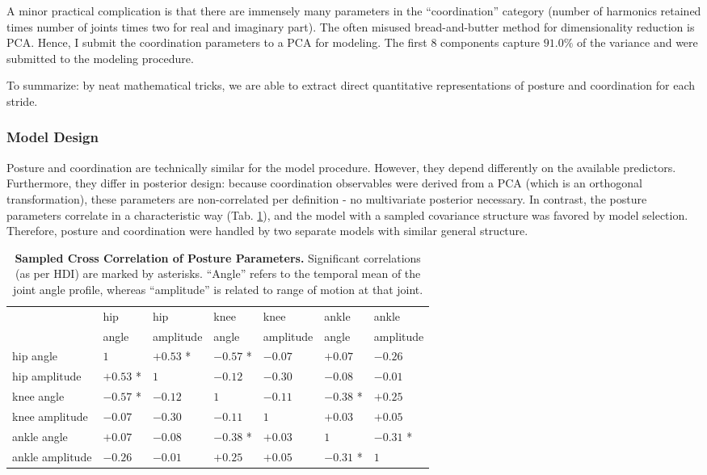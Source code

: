 A minor practical complication is that there are immensely many parameters in the ``coordination'' category (number of harmonics retained times number of joints times two for real and imaginary part).
The often misused bread-and-butter method for dimensionality reduction is PCA.
Hence, I submit the coordination parameters to a PCA for modeling.
The first \(8\) components capture \(91.0 \%\) of the variance and were submitted to the modeling procedure.


To summarize: by neat mathematical tricks, we are able to extract direct quantitative representations of posture and coordination for each stride.


\subsubsection{Model Design}
\label{sec:orga2e576d}
Posture and coordination are technically similar for the model procedure.
However, they depend differently on the available predictors.
Furthermore, they differ in posterior design: because coordination observables were derived from a PCA (which is an orthogonal transformation), these parameters are non-correlated per definition - no multivariate posterior necessary.
In contrast, the posture parameters correlate in a characteristic way (Tab. \ref{tab:posturecorrelation}), and the model with a sampled covariance structure was favored by model selection.
Therefore, posture and coordination were handled by two separate models with similar general structure.

\begin{table}[p]
\caption{\label{tab:posturecorrelation}\textbf{Sampled Cross Correlation of Posture Parameters.} Significant correlations (as per HDI) are marked by asterisks. ``Angle'' refers to the temporal mean of the joint angle profile, whereas ``amplitude'' is related to range of motion at that joint.}
\centering
\begin{tabular}{|l|l|l|l|l|l|l|}
\hline
 & hip & hip & knee & knee & ankle & ankle \\[0pt]
 & angle & amplitude & angle & amplitude & angle & amplitude\\[0pt]
\hline
hip angle & \(1\) & \(+0.53\) * & \(-0.57\) * & \(-0.07\) & \(+0.07\) & \(-0.26\)\\[0pt]
hip amplitude & \(+0.53\) * & \(1\) & \(-0.12\) & \(-0.30\) & \(-0.08\) & \(-0.01\)\\[0pt]
knee angle & \(-0.57\) * & \(-0.12\) & \(1\) & \(-0.11\) & \(-0.38\) * & \(+0.25\)\\[0pt]
knee amplitude & \(-0.07\) & \(-0.30\) & \(-0.11\) & \(1\) & \(+0.03\) & \(+0.05\)\\[0pt]
ankle angle & \(+0.07\) & \(-0.08\) & \(-0.38\) * & \(+0.03\) & \(1\) & \(-0.31\) *\\[0pt]
ankle amplitude & \(-0.26\) & \(-0.01\) & \(+0.25\) & \(+0.05\) & \(-0.31\) * & \(1\)\\[0pt]
\hline
\end{tabular}
\end{table}


